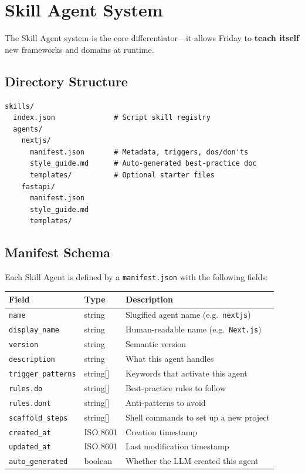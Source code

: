 \documentclass[11pt,a4paper]{article}
\begin{document}
\section{Skill Agent System}

The Skill Agent system is the core differentiator---it allows Friday to \textbf{teach itself} new frameworks and domains at runtime.

\subsection{Directory Structure}

\begin{lstlisting}[language={},title={Skill Agent layout}]
skills/
  index.json              # Script skill registry
  agents/
    nextjs/
      manifest.json       # Metadata, triggers, dos/don'ts
      style_guide.md      # Auto-generated best-practice doc
      templates/          # Optional starter files
    fastapi/
      manifest.json
      style_guide.md
      templates/
\end{lstlisting}

\subsection{Manifest Schema}

Each Skill Agent is defined by a \texttt{manifest.json} with the following fields:

\begin{table}[h!]
\centering
\begin{tabular}{@{}llp{6.5cm}@{}}
\toprule
\textbf{Field} & \textbf{Type} & \textbf{Description} \\
\midrule
\texttt{name} & string & Slugified agent name (e.g.\ \texttt{nextjs}) \\
\texttt{display\_name} & string & Human-readable name (e.g.\ \texttt{Next.js}) \\
\texttt{version} & string & Semantic version \\
\texttt{description} & string & What this agent handles \\
\texttt{trigger\_patterns} & string[] & Keywords that activate this agent \\
\texttt{rules.do} & string[] & Best-practice rules to follow \\
\texttt{rules.dont} & string[] & Anti-patterns to avoid \\
\texttt{scaffold\_steps} & string[] & Shell commands to set up a new project \\
\texttt{created\_at} & ISO 8601 & Creation timestamp \\
\texttt{updated\_at} & ISO 8601 & Last modification timestamp \\
\texttt{auto\_generated} & boolean & Whether the LLM created this agent \\
\bottomrule
\end{tabular}
\end{table}
\end{document}
